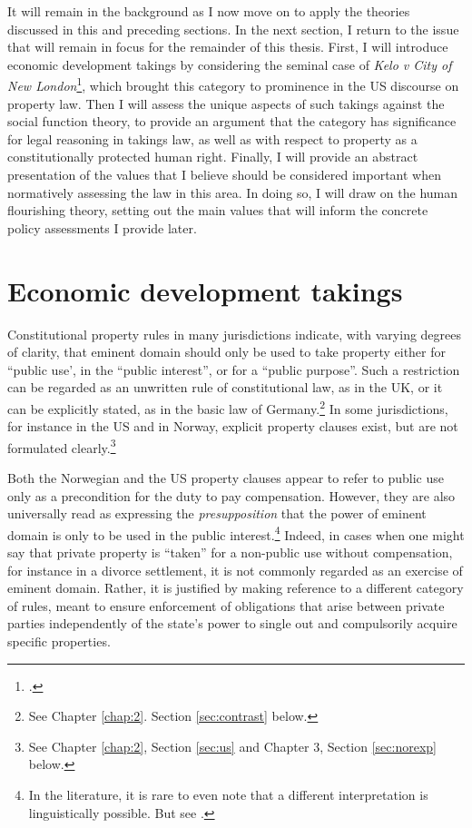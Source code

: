 It will remain in the background as I now move on to apply the theories discussed in this and preceding sections. In the next section,  I return to the issue that will remain in focus for the remainder of this thesis. First, I will introduce economic development takings by considering the seminal case of {\it Kelo v City of New London}\footcite{kelo05}, which brought this category to prominence in the US discourse on property law. Then I will assess the unique aspects of such takings against the social function theory, to provide an argument that the category has significance for legal reasoning in takings law, as well as with respect to property as a constitutionally protected human right. Finally, I will provide an abstract presentation of the values that I believe should be considered important when normatively assessing the law in this area. In doing so, I will draw on the human flourishing theory, setting out the main values that will inform the concrete policy assessments I provide later. 

\section{Economic development takings}\label{sec:edt}

Constitutional property rules in many jurisdictions indicate, with varying degrees of clarity, that eminent domain should only be used to take property either for ``public use', in the ``public interest'', or for a ``public purpose''. Such a restriction can be regarded as an unwritten rule of constitutional law, as in the UK, or it can be explicitly stated, as in the basic law of Germany.\footnote{See Chapter \ref{chap:2}. Section \ref{sec:contrast} below.} In some jurisdictions, for instance in the US and in Norway, explicit property clauses exist, but are not formulated clearly.\footnote{See Chapter \ref{chap:2}, Section \ref{sec:us} and Chapter 3, Section \ref{sec:norexp} below.}

Both the Norwegian and the US property clauses appear to refer to public use only as a precondition for the duty to pay compensation. However, they are also universally read as expressing the {\it presupposition} that the power of eminent domain is only to be used in the public interest.\footnote{In the literature, it is rare to even note that a different interpretation is linguistically possible. But see \cite[205]{berger78}.} Indeed, in cases when one might say that private property is ``taken'' for a non-public use without compensation, for instance in a divorce settlement, it is not commonly regarded as an exercise of eminent domain. Rather, it is justified by making reference to a different category of rules, meant to ensure enforcement of obligations that arise between private parties independently of the state's power to single out and compulsorily acquire specific properties.

